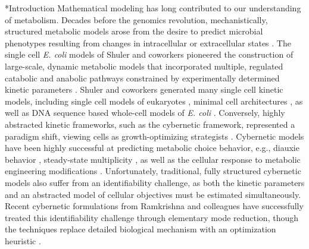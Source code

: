 \documentclass[12pt]{article}
\makeatletter
\renewcommand\section{\@startsection
	{subsection}{2}{0mm}
	{-0.2in}
	{0.05\baselineskip}
	{\normalfont\large\bfseries}}
\makeatother
\begin{document}
\section*{Introduction}
Mathematical modeling has long contributed to our understanding of metabolism. 
Decades before the genomics revolution, mechanistically, structured metabolic models arose from the desire to predict microbial phenotypes resulting from changes in intracellular or extracellular states \citep{1976_fredrickson_BiotechBioeng}. 
The single cell \textit{E. coli} models of Shuler and coworkers pioneered the construction of large-scale, dynamic metabolic models that incorporated multiple, regulated catabolic and anabolic pathways constrained by experimentally determined kinetic parameters \citep{1984_domach_shuler_BiotechBioeng_01}. 
Shuler and coworkers generated many single cell kinetic models, including single cell models of eukaryotes \citep{1989_steinmeyer_shuler_ChemEngSci,1992_wu_shuler_AnnNYAcadSci}, minimal cell architectures \citep{2004_castellanos_shuler_PNAS}, as well as DNA sequence based whole-cell models of \textit{E. coli} \citep{2008_atlas_shuler_IETSysBio}.
Conversely, highly abstracted kinetic frameworks, such as the cybernetic framework, represented a paradigm shift, viewing cells as growth-optimizing strategists \citep{1985_dhurjati_ramkrishna_tsao_BiotechBioeng}. 
Cybernetic models have been highly successful at predicting metabolic choice behavior, e.g., diauxie behavior \citep{1986_kompala_ramkrishna_tsao_BiotechBioeng}, steady-state multiplicity \citep{2012_kim_ramkrishna_BiotechProg}, as well as the cellular response to metabolic engineering modifications \citep{1999_varner_ramkrishna_MetaEng}. 
Unfortunately, traditional, fully structured cybernetic models also suffer from an identifiability challenge, as both the kinetic parameters and an abstracted model of cellular objectives must be estimated simultaneously. 
Recent cybernetic formulations from Ramkrishna and colleagues have successfully treated this identifiability challenge through elementary mode reduction, though the techniques replace detailed biological mechanism with an optimization heuristic \cite{2009_song_ramkrishna_BiotechBioeng,Song:2011aa}. 
\end{document}
